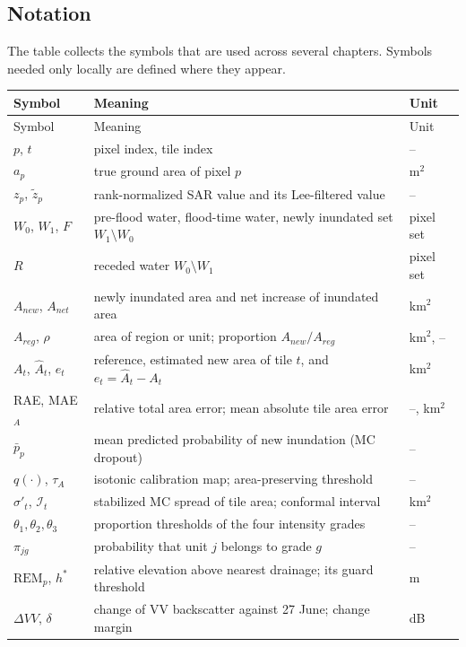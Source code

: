 \subsection{Notation}

The table collects the symbols that are used across several chapters. Symbols needed only locally are defined where they appear.

\begingroup
\small
\renewcommand{\arraystretch}{0.95}
\begin{longtable}{p{}p{}p{}}
\toprule
Symbol & Meaning & Unit \\
\midrule
\endfirsthead
\toprule
Symbol & Meaning & Unit \\
\midrule
\endhead
\bottomrule
\endfoot
$p$, $t$ & pixel index, tile index & -- \\
$a_p$ & true ground area of pixel $p$ & m$^2$ \\
$z_p$, $\tilde z_p$ & rank-normalized SAR value and its Lee-filtered value & -- \\
$W_0$, $W_1$, $F$ & pre-flood water, flood-time water, newly inundated set $W_1\setminus W_0$ & pixel set \\
$R$ & receded water $W_0\setminus W_1$ & pixel set \\
$A_{new}$, $A_{net}$ & newly inundated area and net increase of inundated area & km$^2$ \\
$A_{reg}$, $\rho$ & area of region or unit; proportion $A_{new}/A_{reg}$ & km$^2$, -- \\
$A_t$, $\hat A_t$, $e_t$ & reference, estimated new area of tile $t$, and $e_t=\hat A_t-A_t$ & km$^2$ \\
RAE, MAE$_A$ & relative total area error; mean absolute tile area error & --, km$^2$ \\
$\bar p_p$ & mean predicted probability of new inundation (MC dropout) & -- \\
$q(\cdot)$, $\tau_A$ & isotonic calibration map; area-preserving threshold & -- \\
$\sigma'_t$, $\mathcal I_t$ & stabilized MC spread of tile area; conformal interval & km$^2$ \\
$\theta_1,\theta_2,\theta_3$ & proportion thresholds of the four intensity grades & -- \\
$\pi_{jg}$ & probability that unit $j$ belongs to grade $g$ & -- \\
$\mathrm{REM}_p$, $h^*$ & relative elevation above nearest drainage; its guard threshold & m \\
$\Delta VV$, $\delta$ & change of VV backscatter against 27 June; change margin & dB \\

\end{longtable}
